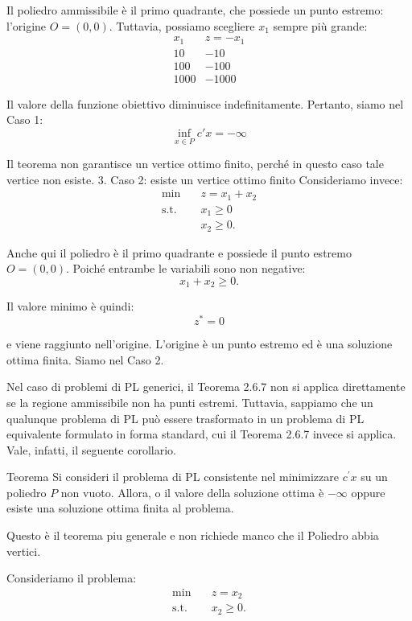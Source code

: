 Il poliedro ammissibile è il primo quadrante, che possiede un punto estremo: l'origine \(O=(0,0)\).
Tuttavia, possiamo scegliere \(x_1\) sempre più grande:
\[
\begin{array}{c|c}
x_1 & z=-x_1\\ \hline
10 & -10\\
100 & -100\\
1000 & -1000
\end{array}
\]

Il valore della funzione obiettivo diminuisce indefinitamente.
Pertanto, siamo nel Caso 1:
\[
\boxed{\inf_{x\in P}c'x=-\infty}
\]

Il teorema non garantisce un vertice ottimo finito, perché in questo caso tale vertice non esiste.
3. Caso 2: esiste un vertice ottimo finito
Consideriamo invece:
\[
\begin{aligned}
\min \quad & z=x_1+x_2\\
\text{s.t.}\quad & x_1\geq 0\\
&x_2\geq 0.
\end{aligned}
\]

Anche qui il poliedro è il primo quadrante e possiede il punto estremo \(O=(0,0)\).
Poiché entrambe le variabili sono non negative:
\[
x_1+x_2\geq 0.
\]

Il valore minimo è quindi:
\[
\boxed{z^*=0}
\]

e viene raggiunto nell'origine. L'origine è un punto estremo ed è una soluzione ottima finita.
Siamo nel Caso 2.


Nel caso di problemi di PL generici, il Teorema 2.6.7 non si applica direttamente se la regione ammissibile non ha punti estremi. Tuttavia, sappiamo che un qualunque problema di PL può essere trasformato in un problema di PL equivalente formulato in forma standard, cui il Teorema 2.6.7 invece si applica. Vale, infatti, il seguente corollario.

\begin{theorem}{Teorema}
Si consideri il problema di PL consistente nel minimizzare $c^{\prime}x$ su un poliedro $P$ non vuoto. Allora, o il valore della soluzione ottima è $-\infty$ oppure esiste una soluzione ottima finita al problema.
\end{theorem}

Questo è il teorema piu generale e non richiede manco che il Poliedro abbia vertici.

Consideriamo il problema:
\[
\begin{aligned}
\min \quad & z=x_2\\
\text{s.t.}\quad & x_2\geq 0.
\end{aligned}
\]

